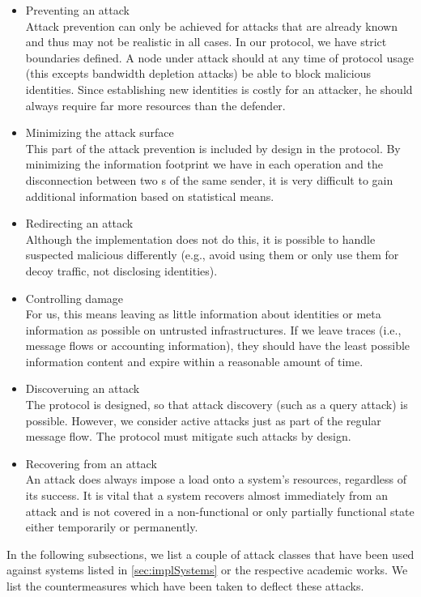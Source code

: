 \begin{itemize}
	\item Preventing an attack\\
	Attack prevention can only be achieved for attacks that are already known and thus may not be realistic in all cases. In our protocol, we have strict boundaries defined. A node under attack should at any time of protocol usage (this excepts bandwidth depletion attacks) be able to block malicious identities. Since establishing new identities is costly for an attacker, he should always require far more resources than the defender.
	\item Minimizing the attack surface\\
	This part of the attack prevention is included by design in the protocol. By minimizing the information footprint we have in each operation and the disconnection between two s of the same sender, it is very difficult to gain additional information based on statistical means.
	\item Redirecting an attack\\
	Although the implementation does not do this, it is possible to handle suspected malicious \VortexNode{} differently (e.g., avoid using them or only use them for decoy traffic, not disclosing identities).
	\item Controlling damage\\
	For us, this means leaving as little information about identities or meta information as possible on untrusted infrastructures. If we leave traces (i.e., message flows or accounting information), they should have the least possible information content and expire within a reasonable amount of time.
	\item Discoveruing an attack\\
	The protocol is designed, so that attack discovery (such as a query attack) is possible. However, we consider active attacks just as part of the regular message flow. The protocol must mitigate such attacks by design.
	\item Recovering from an attack\\
	An attack does always impose a load onto a system's resources, regardless of its success. It is vital that a system recovers almost immediately from an attack and is not covered in a non-functional or only partially functional state either temporarily or permanently.
\end{itemize}

In the following subsections, we list a couple of attack classes that have been used against systems listed in \cref{sec:implSystems} or the respective academic works. We list the countermeasures which have been taken to deflect these attacks.


